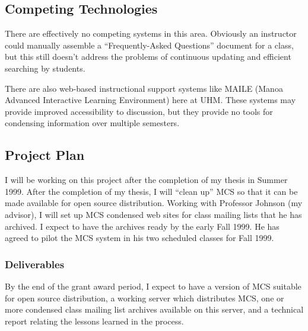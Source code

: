 \subsection{Competing Technologies}
There are effectively no competing systems in this area. Obviously an
instructor could manually assemble a ``Frequently-Asked Questions'' document
for a class, but this still doesn't address the problems of continuous updating 
and efficient searching by students.

There are also web-based instructional support systems like MAILE (Manoa Advanced
Interactive Learning Environment) here at UHM. These systems may provide
improved accessibility to discussion, but they provide no tools for condensing
information over multiple semesters.





\subsection{Project Plan}

I will be working on this project after the completion of my thesis in Summer
1999. After the completion of my thesis, I will ``clean up'' MCS so that it can
be made available for open source distribution. Working with Professor Johnson
(my advisor), I will set up MCS condensed web sites for class mailing lists
that he has archived. I expect to have the archives ready by the early Fall
1999. He has agreed to pilot the MCS system in his two scheduled classes for
Fall 1999.

\subsubsection{Deliverables}
By the end of the grant award period, I expect to have a version of MCS
suitable for open source distribution, a working server which distributes MCS,
one or more condensed class mailing list archives available on this server, and
a technical report relating the lessons learned in the process.


